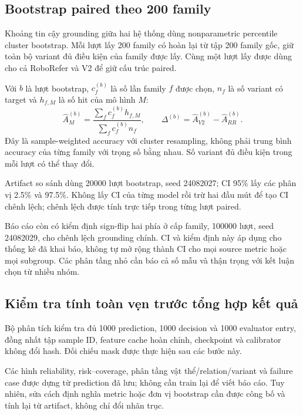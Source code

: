 \subsection{Bootstrap paired theo 200 family}

Khoảng tin cậy grounding giữa hai hệ thống dùng
nonparametric percentile cluster bootstrap.
Mỗi lượt lấy 200 family có hoàn lại từ tập 200
family gốc, giữ toàn bộ variant đủ điều kiện của
family được lấy. Cùng một lượt lấy được dùng cho
cả RoboRefer và V2 để giữ cấu trúc paired.

Với $b$ là lượt bootstrap, $c_f^{(b)}$ là số lần
family $f$ được chọn, $n_f$ là số variant có target
và $h_{f,M}$ là số hit của mô hình $M$:
\begin{equation}
    \widehat{A}_M^{(b)}
    =\frac{\sum_f c_f^{(b)}h_{f,M}}
    {\sum_f c_f^{(b)}n_f},\qquad
    \Delta^{(b)}
    =\widehat{A}_{V2}^{(b)}
    -\widehat{A}_{RR}^{(b)}.
\end{equation}
Đây là sample-weighted accuracy với cluster resampling,
không phải trung bình accuracy của từng family với
trọng số bằng nhau. Số variant đủ điều kiện trong
mỗi lượt có thể thay đổi.

Artifact so sánh dùng 20000 lượt bootstrap, seed
24082027; CI 95\% lấy các phân vị 2.5\% và 97.5\%.
Không lấy CI của từng model rồi trừ hai đầu mút
để tạo CI chênh lệch; chênh lệch được tính trực
tiếp trong từng lượt paired.

Báo cáo còn có kiểm định sign-flip hai phía ở
cấp family, 100000 lượt, seed 24082029, cho chênh
lệch grounding chính. CI và kiểm định này áp dụng
cho thống kê đã khai báo, không tự mở rộng thành
CI cho mọi source metric hoặc mọi subgroup.
Các phân tầng nhỏ cần báo cả số mẫu và thận trọng
với kết luận chọn từ nhiều nhóm.

\subsection{Kiểm tra tính toàn vẹn trước tổng hợp kết quả}

Bộ phân tích kiểm tra đủ 1000 prediction, 1000
decision và 1000 evaluator entry, đồng nhất tập
sample ID, feature cache hoàn chỉnh, checkpoint
và calibrator không đổi hash.
Đối chiếu mask được thực hiện sau các bước này.

Các hình reliability, risk--coverage, phân tầng
vật thể/relation/variant và failure case được
dựng từ prediction đã lưu; không cần train lại
để viết báo cáo. Tuy nhiên, sửa cách định nghĩa
metric hoặc đơn vị bootstrap cần được công bố
và tính lại từ artifact, không chỉ đổi nhãn trục.

